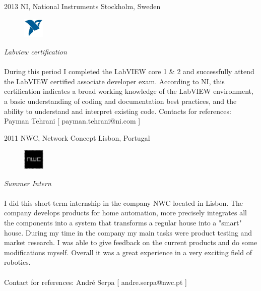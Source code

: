 \documentclass[]{friggeri-cv} %
\begin{document}
\begin{entrylist}
\entry
{2013}
{NI, National Instruments}
{Stockholm, Sweden}
{
\begin{figure}
	\vspace{-20pt}
	\begin{center}
		\includegraphics[width=1cm,height=1cm]{ni}
	\end{center}
\end{figure}
\emph{Labview certification} 
\\ \\
During this period I completed the LabVIEW core 1 \& 2 and successfully attend the LabVIEW certified associate developer exam. According to NI, this certification indicates a broad working knowledge of the LabVIEW environment, a basic understanding of coding and documentation best practices, and the ability to understand and interpret existing code. 
Contacts for references: Payman Tehrani [ payman.tehrani@ni.com ]
}
\end{entrylist}


\begin{entrylist2}
\entrynew
{2011}
{NWC, Network Concept}
{Lisbon, Portugal}
{
\begin{figure}
	\vspace{-20pt}
	\begin{center}
		\includegraphics[width=1cm,height=1cm]{nwc}
	\end{center}
\end{figure}
\emph{Summer Intern} \\ \\
I did this short-term internship in the company NWC located in Lisbon. The company develops products for home automation, more precisely integrates all the components into a system that transforms a regular house into a "smart" house. During my time in the company my main tasks were product testing and market research. I was able to give feedback on the current products and do some modifications myself. Overall it was a great experience in a very exciting field of robotics.
\\ \\
Contact for references: André Serpa [ andre.serpa@nwc.pt ]
}
\end{entrylist2}
\end{document}
